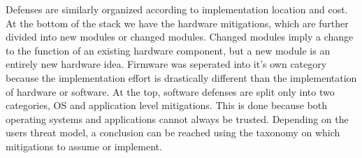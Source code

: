 Defenses are similarly organized according to implementation location and cost.
At the bottom of the stack we have the hardware mitigations, which are further divided into new modules or changed modules.
Changed modules imply a change to the function of an existing hardware component, but a new module is an entirely new hardware idea.
Firmware was seperated into it's own category because the implementation effort is drastically different than the implementation of hardware or software.
At the top, software defenses are split only into two categories, OS and application level mitigations.
This is done because both operating systems and applications cannot always be trusted.
Depending on the users threat model, a conclusion can be reached using the taxonomy on which mitigations to assume or implement.

